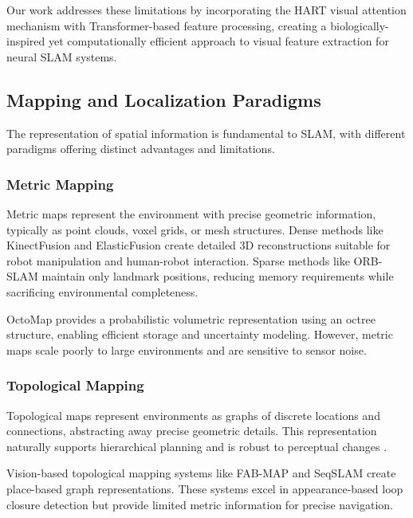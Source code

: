 Our work addresses these limitations by incorporating the HART visual attention mechanism with Transformer-based feature processing, creating a biologically-inspired yet computationally efficient approach to visual feature extraction for neural SLAM systems.


\subsection{Mapping and Localization Paradigms}

The representation of spatial information is fundamental to SLAM, with different paradigms offering distinct advantages and limitations.

\subsubsection{Metric Mapping}

Metric maps represent the environment with precise geometric information, typically as point clouds, voxel grids, or mesh structures.
Dense methods like KinectFusion \cite{Newcombe2011} and ElasticFusion \cite{Whelan2016} create detailed 3D reconstructions suitable for robot manipulation and human-robot interaction.
Sparse methods like ORB-SLAM \cite{MurArtal2015} maintain only landmark positions, reducing memory requirements while sacrificing environmental completeness.

OctoMap \cite{Hornung2013} provides a probabilistic volumetric representation using an octree structure, enabling efficient storage and uncertainty modeling.
However, metric maps scale poorly to large environments and are sensitive to sensor noise.

\subsubsection{Topological Mapping}

Topological maps represent environments as graphs of discrete locations and connections, abstracting away precise geometric details.
This representation naturally supports hierarchical planning and is robust to perceptual changes \cite{Lowry2016}.

Vision-based topological mapping systems like FAB-MAP \cite{Cummins2008} and SeqSLAM \cite{Milford2012} create place-based graph representations.
These systems excel in appearance-based loop closure detection but provide limited metric information for precise navigation.

